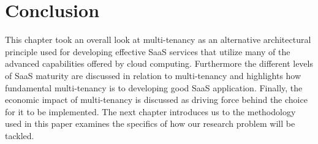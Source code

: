 \section{Conclusion}

This chapter took an overall look at multi-tenancy as an alternative architectural principle used for developing effective SaaS services that utilize many of the advanced capabilities offered by cloud computing. Furthermore the different levels of SaaS maturity are discussed in relation to multi-tenancy and highlights how fundamental multi-tenancy is to developing good SaaS application. Finally, the economic impact of multi-tenancy is discussed as driving force behind the choice for it to be implemented. The next chapter introduces us to the methodology used in this paper examines the specifics of how our research problem will be tackled.
